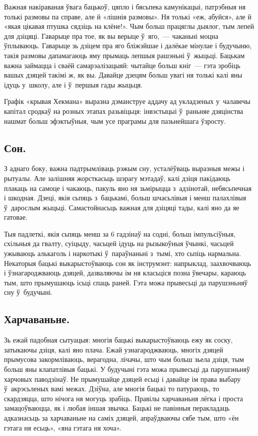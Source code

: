 Важная накіраваная ўвага бацькоў, цяпло і бясьпека камунікацыі, патрэбныя ня толькі размовы па справе, але й «лішнія размовы». Ня толькі «еж, абуйся», але й «якая цікавая птушка сядзіць на клёне!». Чым больш працяглы дыялог, тым лепей для дзіцяці. Гаварыце пра тое, як вы верыце ў~яго,~--- чаканьні моцна ўплываюць. Гаварыце зь дзіцем пра яго бліжэйшае і далёкае мінулае і будучыню, такія размовы дапамагаюць яму прымаць лепшыя рашэньні ў~жыцьці. Бацькам важна займацца і сваёй самарэалізацыяй: чытайце больш кніг~--- гэта зробіць вашых дзяцей такімі ж, як вы. Давайце дзецям больш увагі ня толькі калі яны ідуць у~школу, але і ў~першыя гады жыцьця. 

Графік «крывая Хекмана» выразна дэманструе аддачу ад укладзеных у~чалавечы капітал сродкаў на розных этапах разьвіцьця: інвэстыцыі ў~раньняе дзяцінства нашмат больш эфэктыўныя, чым усе праграмы для пазьнейшага ўзросту.

\subsection*{Сон.}

З аднаго боку, важна падтрымліваць рэжым сну, усталёўваць выразныя межы і рытуалы. Але залішняя жорсткасьць шэрагу мэтадаў, калі дзіця пакідаюць плакаць на самоце і чакаюць, пакуль яно ня зьмірыцца з~адзінотай, небясьпечная і шкодная. Дзеці, якія сьпяць з~бацькамі, больш шчасьлівыя і менш палахлівыя ў~дарослым жыцьці. Самастойнасьць важная для дзіцяці тады, калі яно да яе гатовае.

Тыя падлеткі, якія сьпяць менш за 6 гадзінаў на содні, больш імпульсіўныя, схільныя да гвалту, суіцыду, часьцей ідуць на рызыкоўныя ўчынкі, часьцей ужываюць алькаголь і наркотыкі ў~параўнаньні з~тымі, хто сьпіць нармальна. Некаторыя бацькі выкарыстоўваюць сон як інструмэнт: напрыклад, заахвочваюць і ўзнагароджваюць дзяцей, дазваляючы ім ня класьціся позна ўвечары, караюць тым, што прымушаюць ісьці спаць раней. Гэта можа прывесьці да парушэньняў сну ў~будучыні.

\subsection*{Харчаваньне.}

Зь ежай падобная сытуацыя: многія бацькі выкарыстоўваюць ежу як соску, затыкаючы дзіця, калі яно плача. Ежай узнагароджваюць, многіх дзяцей прымусова закормліваюць, верагодна, лічачы, што чым больш зьела дзіця, тым больш яны клапатлівыя бацькі. У будучыні гэта можа прывесьці да парушэньняў харчовых паводзінаў. Не прымушайце дзяцей есьці і давайце ім права выбару ў~акрэсьленых вамі межах. Дзіўна, але многія бацькі то патураюць, то скардзяцца, што нічога ня могуць зрабіць. Правілы харчаваньня лёгка і проста замацоўваюцца, як і любая іншая звычка. Бацькі не павінныя перакладаць адказнасьць за харчаваньне на саміх дзяцей, апраўдваючы сябе тым, што «ён гэтага ня есьць», «яна гэтага ня хоча».


